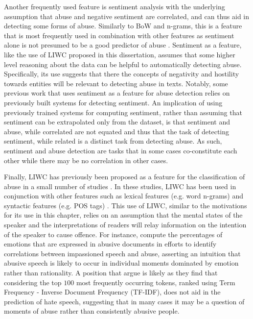 Another frequently used feature is sentiment analysis \citep{Fortuna:2018} with the underlying assumption that abuse and negative sentiment are correlated, and can thus aid in detecting some forms of abuse. Similarly to BoW and n-grams, this is a feature that is most frequently used in combination with other features as sentiment alone is not presumed to be a good predictor of abuse \citep{Fortuna:2018}. Sentiment as a feature, like the use of LIWC proposed in this dissertation, assumes that some higher level reasoning about the data can be helpful to automatically detecting abuse. Specifically, its use suggests that there the concepts of negativity and hostility towards entities will be relevant to detecting abuse in texts. Notably, some previous work that uses sentiment as a feature for abuse detection \citep{Davidson:2017} relies on previously built systems for detecting sentiment. An implication of using previously trained systems for computing sentiment, rather than assuming that sentiment can be extrapolated only from the dataset, is that sentiment and abuse, while correlated are not equated and thus that the task of detecting sentiment, while related is a distinct task from detecting abuse. As such, sentiment and abuse detection are tasks that in some cases co-constitute each other while there may be no correlation in other cases.

Finally, LIWC has previously been proposed as a feature for the classification of abuse in a small number of studies \citep{Nina-Alcocer:2019,Joksimovic:2019}. In these studies, LIWC has been used in conjunction with other features such as lexical features (e.g. word n-grams) and syntactic features (e.g. POS tags) \citep{Joksimovic:2019}. This use of LIWC, similar to the motivations for its use in this chapter, relies on an assumption that the mental states of the speaker and the interpretations of readers will relay information on the intention of the speaker to cause offence. For instance, \citet{Nina-Alcocer:2019} compute the percentages of emotions that are expressed in abusive documents in efforts to identify correlations between impassioned speech and abuse, asserting an intuition that abusive speech is likely to occur in individual moments dominated by emotion rather than rationality. A position that \citep{Waseem:2016} argue is likely as they find that considering the top $100$ most frequently occurring tokens, ranked using Term Frequency - Inverse Document Frequency (TF-IDF), does not aid in the prediction of hate speech, suggesting that in many cases it may be a question of moments of abuse rather than consistently abusive people.

